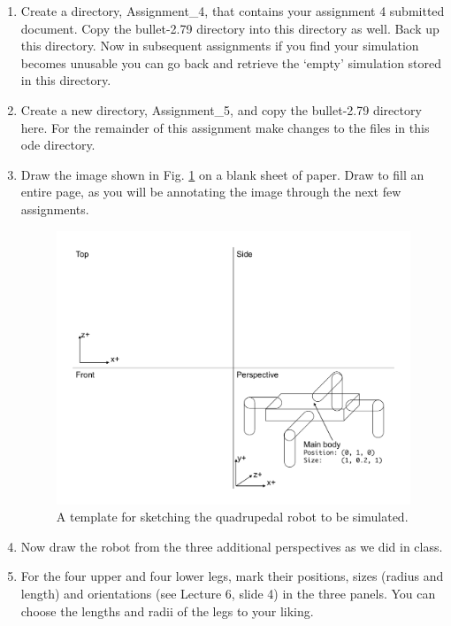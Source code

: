 \documentclass[12pt]{article}
\begin{document}
\begin{enumerate}

\item Create a directory, Assignment\_4, that contains your assignment 4 submitted document. Copy the bullet-2.79 directory into this directory as well. Back up this directory. Now in subsequent assignments if you find your simulation becomes unusable you can go back and retrieve the `empty' simulation stored in this directory.

\item Create a new directory, Assignment\_5, and copy the bullet-2.79 directory here. For the remainder of this assignment make changes to the files in this ode directory.

\item Draw the image shown in Fig. \ref{Fig1} on a blank sheet of paper. Draw to fill an entire page, as you will be annotating the image through the next few assignments.

\begin{figure}[!t]
\centerline{
\includegraphics[width=1.0\textwidth]{Robot_Schematic}
}
\caption{A template for sketching the quadrupedal robot to be simulated.}
\label{Fig1}
\end{figure}

\item Now draw the robot from the three additional perspectives as we did in class.

\item For the four upper and four lower legs, mark their positions, sizes (radius and length) and orientations (see Lecture 6, slide 4) in the three panels. You can choose the lengths and radii of the legs to your liking.


\end{enumerate}
\end{document}
